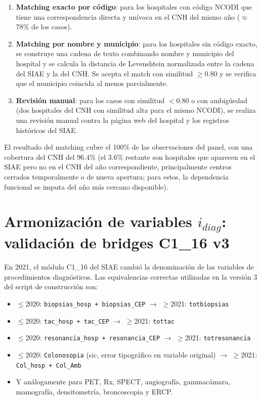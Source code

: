 \begin{enumerate}
  \item \textbf{Matching exacto por código}: para los hospitales con código NCODI que tiene una correspondencia directa y unívoca en el CNH del mismo año ($\approx$ 78\% de los casos).
  \item \textbf{Matching por nombre y municipio}: para los hospitales sin código exacto, se construye una cadena de texto combinando nombre y municipio del hospital y se calcula la distancia de Levenshtein normalizada entre la cadena del SIAE y la del CNH. Se acepta el match con similitud $\geq 0.80$ y se verifica que el municipio coincida al menos parcialmente.
  \item \textbf{Revisión manual}: para los casos con similitud $< 0.80$ o con ambigüedad (dos hospitales del CNH con similitud alta para el mismo NCODI), se realiza una revisión manual contra la página web del hospital y los registros históricos del SIAE.
\end{enumerate}

El resultado del matching cubre el 100\% de las observaciones del panel, con una cobertura del CNH del 96.4\% (el 3.6\% restante son hospitales que aparecen en el SIAE pero no en el CNH del año correspondiente, principalmente centros cerrados temporalmente o de nueva apertura; para estos, la dependencia funcional se imputa del año más cercano disponible).

\section{Armonización de variables \texorpdfstring{$i_{diag}$}{i\_diag}: validación de bridges C1\_16 v3}
\label{sec:bridges_v3}

En 2021, el módulo C1\_16 del SIAE cambió la denominación de las variables de procedimientos diagnósticos. Las equivalencias correctas utilizadas en la versión 3 del script de construcción son:
\begin{itemize}
  \item $\leq$2020: \texttt{biopsias\_hosp + biopsias\_CEP} $\rightarrow$ $\geq$2021: \texttt{totbiopsias}
  \item $\leq$2020: \texttt{tac\_hosp + tac\_CEP} $\rightarrow$ $\geq$2021: \texttt{tottac}
  \item $\leq$2020: \texttt{resonancia\_hosp + resonancia\_CEP} $\rightarrow$ $\geq$2021: \texttt{totresonancia}
  \item $\leq$2020: \texttt{Colonosopia} (sic, error tipográfico en variable original) $\rightarrow$ $\geq$2021: \texttt{Col\_hosp + Col\_Amb}
  \item Y análogamente para PET, Rx, SPECT, angiografía, gammacámara, mamografía, densitometría, broncoscopia y ERCP.
\end{itemize}

